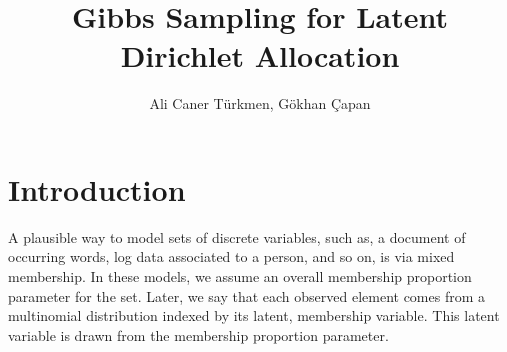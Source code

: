 \documentclass{article}%
\begin{document}
\title{Gibbs Sampling for Latent Dirichlet Allocation}

\author{Ali Caner T\" urkmen, G\" okhan \c Capan}
\date{}

\maketitle

\section{Introduction}
A plausible way to model sets of discrete variables, such as, a document of occurring words, log data associated to a person, and so on, is via mixed membership. In these models, we assume an overall membership proportion parameter for the set. Later, we say that each observed element comes from a multinomial distribution indexed by its latent, membership variable. This latent variable is drawn from the membership proportion parameter. 
\end{document}
